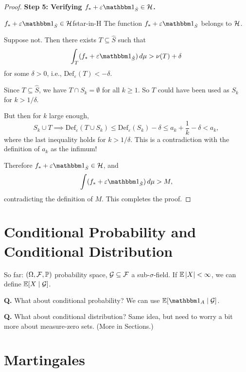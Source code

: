 \begin{proof}
\bigskip
\noindent\textbf{Step 5: Verifying $f_* + \varepsilon \ind_{\hat{S}} \in \cH$.}

\begin{claim}{$f_* + \varepsilon \ind_{\hat{S}} \in \cH$}{fstar-in-H}
    The function $f_* + \varepsilon \ind_{\hat{S}}$ belongs to $\mathcal{H}$.
\end{claim}

Suppose not. Then there exists $T \subseteq \hat{S}$ such that
\[
    \int_T (f_* + \varepsilon \ind_{\hat{S}}) \dmu > \nu(T) + \delta
\]
for some $\delta > 0$, i.e., $\mathrm{Def}_\varepsilon(T) < -\delta$.

Since $T \subseteq \hat{S}$, we have $T \cap S_k = \emptyset$ for all $k \geq 1$. So $T$ could have been used as $S_k$ for $k > 1/\delta$.

But then for $k$ large enough,
\[
    S_k \cup T \implies \mathrm{Def}_\varepsilon(T \cup S_k) \leq \mathrm{Def}_\varepsilon(S_k) - \delta \leq a_k + \frac{1}{k} - \delta < a_k,
\]
where the last inequality holds for $k > 1/\delta$. This is a contradiction with the definition of $a_k$ as the infimum!

\medskip
Therefore $f_* + \varepsilon \ind_{\hat{S}} \in \cH$, and
\[
    \int (f_* + \varepsilon \ind_{\hat{S}}) \dmu > M,
\]
contradicting the definition of $M$. This completes the proof.
\end{proof}

\section{Conditional Probability and Conditional Distribution}

So far: $(\Omega, \mathcal{F}, \mathbb{P})$ probability space, $\mathcal{G} \subseteq \mathcal{F}$ a sub-$\sigma$-field.
If $\mathbb{E}\left|X\right| < \infty$, we can define $\mathbb{E}[X \mid \mathcal{G}]$.

\medskip
\noindent\textbf{Q.} What about conditional probability? We can use $\E[\ind_A \mid \G]$.

\medskip
\noindent\textbf{Q.} What about conditional distribution? Same idea, but need to worry a bit more about measure-zero sets. (More in Sections.)

\section{Martingales}

